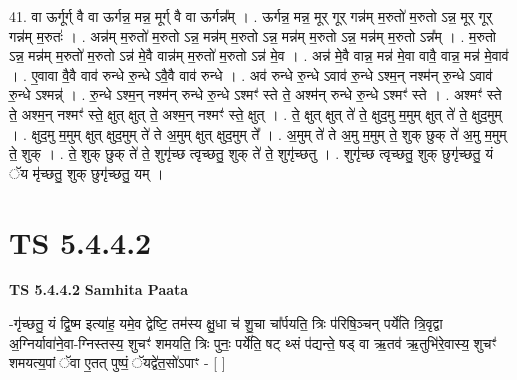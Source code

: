 \documentclass[17pt]{extarticle}
\begin{document}
41. वा ऊर्गूर्ग् वै वा ऊर्गन्न॒ मन्न॒ मूर्ग् वै वा ऊर्गन्न᳚म् । . ऊर्गन्न॒ मन्न॒ मूर् गूर् गन्न॑म् म॒रुतो॑ म॒रुतो ऽन्न॒ मूर् गूर् गन्न॑म् म॒रुतः॑ । . अन्न॑म् म॒रुतो॑ म॒रुतो ऽन्न॒ मन्न॑म् म॒रुतो ऽन्न॒ मन्न॑म् म॒रुतो ऽन्न॒ मन्न॑म् म॒रुतो ऽन्न᳚म् । . म॒रुतो ऽन्न॒ मन्न॑म् म॒रुतो॑ म॒रुतो ऽन्न॑ मे॒वै वान्न॑म् म॒रुतो॑ म॒रुतो ऽन्न॑ मे॒व । . अन्न॑ मे॒वै वान्न॒ मन्न॑ मे॒वा वावै॒ वान्न॒ मन्न॑ मे॒वाव॑ । . ए॒वावा वै॒वै वाव॑ रुन्धे रु॒न्धे ऽवै॒वै वाव॑ रुन्धे । . अव॑ रुन्धे रु॒न्धे ऽवाव॑ रु॒न्धे ऽश्म॒न् नश्म॑न् रु॒न्धे ऽवाव॑ रु॒न्धे ऽश्मन्न्॑ । . रु॒न्धे ऽश्म॒न् नश्म॑न् रुन्धे रु॒न्धे ऽश्मꣳ॑ स्ते ते॒ अश्म॑न् रुन्धे रु॒न्धे ऽश्मꣳ॑ स्ते । . अश्मꣳ॑ स्ते ते॒ अश्म॒न् नश्मꣳ॑ स्ते॒ क्षुत् क्षुत् ते॒ अश्म॒न् नश्मꣳ॑ स्ते॒ क्षुत् । . ते॒ क्षुत् क्षुत् ते॑ ते॒ क्षुद॒मु म॒मुम् क्षुत् ते॑ ते॒ क्षुद॒मुम् । . क्षुद॒मु म॒मुम् क्षुत् क्षुद॒मुम् ते॑ ते अ॒मुम् क्षुत् क्षुद॒मुम् ते᳚ । . अ॒मुम् ते॑ ते अ॒मु म॒मुम् ते॒ शुक् छुक् ते॑ अ॒मु म॒मुम् ते॒ शुक् । . ते॒ शुक् छुक् ते॑ ते॒ शुगृ॑च्छ त्वृच्छतु॒ शुक् ते॑ ते॒ शुगृ॑च्छतु । . शुगृ॑च्छ त्वृच्छतु॒ शुक् छुगृ॑च्छतु॒ यं ॅय मृ॑च्छतु॒ शुक् छुगृ॑च्छतु॒ यम् । \newline
\pagebreak
{}

\section{ TS 5.4.4.2 }

\textbf{TS 5.4.4.2 } \newline
\textbf{Samhita Paata} \newline

-गृ॑च्छतु॒ यं द्वि॒ष्म इत्या॑ह॒ यमे॒व द्वेष्टि॒ तम॑स्य क्षु॒धा च॑ शु॒चा चा᳚र्पयति॒ त्रिः प॑रिषि॒ञ्चन् पर्ये॑ति त्रि॒वृद्वा अ॒ग्निर्यावा॑ने॒वा-ग्निस्तस्य॒ शुचꣳ॑ शमयति॒ त्रिः पुनः॒ पर्ये॑ति॒ षट् थ्सं प॑द्यन्ते॒ षड् वा ऋ॒तव॑ ऋ॒तुभि॑रे॒वास्य॒ शुचꣳ॑ शमयत्य॒पां ॅवा ए॒तत् पुष्पं॒ ॅयद्वे॑त॒सो॑ऽपाꣳ - [  ] \newline
\end{document}
